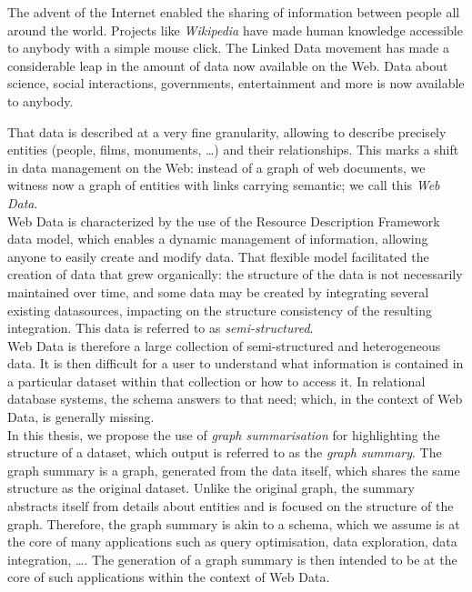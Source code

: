 \vspace{-.2cm}
The advent of the Internet enabled the sharing of information between people all around the world. Projects like \emph{Wikipedia} have made human knowledge accessible to anybody with a simple mouse click. The Linked Data movement has made a considerable leap in the amount of data now available on the Web. Data about science, social interactions, governments, entertainment and more is now available to anybody.

That data is described at a very fine granularity, allowing to describe precisely entities (people, films, monuments, \ldots) and their relationships. This marks a shift in data management on the Web: instead of a graph of web documents, we witness now a graph of entities with links carrying semantic; we call this \emph{Web Data}.\\

\vspace{-.2cm}
Web Data is characterized by the use of the Resource Description Framework data model, which enables a dynamic management of information, allowing anyone to easily create and modify data.
That flexible model facilitated the creation of data that grew organically: the structure of the data is not necessarily maintained over time, and some data may be created by integrating several existing datasources, impacting on the structure consistency of the resulting integration. This data is referred to as \emph{semi-structured}.\\

\vspace{-.2cm}
Web Data is therefore a large collection of semi-structured and heterogeneous data. It is then difficult for a user to understand what information is contained in a particular dataset within that collection or how to access it. In relational database systems, the schema answers to that need; which, in the context of Web Data, is generally missing.\\

\vspace{-.2cm}
In this thesis, we propose the use of \emph{graph summarisation} for highlighting the structure of a dataset, which output is referred to as the \emph{graph summary}. The graph summary is a graph, generated from the data itself, which shares the same structure as the original dataset. Unlike the original graph, the summary abstracts itself from details about entities and is focused on the structure of the graph. Therefore, the graph summary is akin to a schema, which we assume is at the core of many applications such as query optimisation, data exploration, data integration, \ldots. The generation of a graph summary is then intended to be at the core of such applications within the context of Web Data.\\

